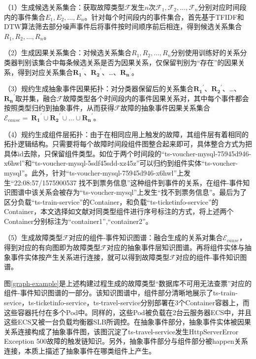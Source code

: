 （1）生成候选关系集合：获取故障类型$\mathcal{F}$发生$n$次$\mathcal{F}_1,\mathcal{F}_2,…,\mathcal{F}_n$分别对应时间段内的事件集合$E_1,E_2,…,E_n$。针对每个时间段内的事件集合，首先基于TFIDF\cite{joachims1996probabilistic}和DTW算法\cite{mueen2016extracting}筛去部分噪声事件后将事件按时间顺序前后相连，得到候选关系集合$R_1,R_2,…,R_n$。  

（2）生成因果关系集合：对候选关系集合$R_1,R_2,…,R_n$分别使用训练好的关系分类器判别该集合中每条候选关系是否为因果关系，仅保留判别为“存在”的因果关系，得到对应关系集合${\mathbf{R}_\mathbf{1}}^\prime$、${\mathbf{R}_\mathbf{2}}^\prime$、…、${\mathbf{R}_\mathbf{n}}^\prime$。

（3）规约生成抽象事件因果拓扑：对分类器保留后的关系集合${\mathbf{R}_\mathbf{1}}^\prime$、${\mathbf{R}_\mathbf{2}}^\prime$、…、${\mathbf{R}_\mathbf{n}}^\prime$取并集，融合$\mathcal{F}$故障类型各个时间段内的事件因果关系对，其中每个事件都会按照类型归约到抽象事件，从而获得$\mathcal{F}$故障的抽象事件因果关系集合$\mathcal{E}_{cause}=\ {\mathbf{R}_\mathbf{1}}^\prime\cup{\mathbf{R}_\mathbf{2}}^\prime\cup\ldots\cup{\mathbf{R}_\mathbf{n}}^\prime$。

（4）规约生成组件层拓扑：由于在相同应用上触发的故障，其组件层有着相同的拓扑逻辑结构。只需要将每个故障时间段组件图整合起来即可，具体整合方式为把具体id去除，只保留组件类型。如位于两个时间段的“ts-voucher-mysql-75945d946-x6hwl”和“ts-voucher-mysql-5sdf45sdd-xz45z”可以归约到组件实体“ts-voucher-mysql”。此外，针对“ts-voucher-mysql-75945d946-x6hwl”上发生“22:08:57/1575900537 找不到票务信息”这种组件到事件的关系，在组件-事件知识图谱中该关系会被存为“ts-voucher-mysql”上发生“找不到票务信息”。最后为了区分负载“ts-train-service”的Container，和负载“ts-ticketinfo-service”的Container，本文选择如文献\parencite{qiu2020causality-mining-knowledge-graph}对同类型组件进行序号标注的方式，将上述两个Container分别标注为“container1”,“container2”。

（5）生成故障类型$\mathcal{F}$对应的组件-事件知识图谱：融合生成的关系对集合$\mathcal{E}_{cause}$，得到对应的有向图即为故障类型$\mathcal{F}$对应的抽象事件层知识图谱。再将组件实体与抽象事件实体按产生关系进行连接，就可以得到故障类型$\mathcal{F}$对应的组件-事件知识图谱。

图\ref{graph-example}是上述构建过程生成的故障类型“数据库不可用无法查票”对应的组件-事件知识图谱的一部分。该知识图谱中，组件部分清晰地展示了ts-train-sevice，ts-ticketinfo-service，ts-travel-service分别部署在3个Container容器上，而这些容器托付在多个Pod中。同样的，这些Pod被负载在2台云服务器ECS中，并且这些ECS又被一台负载均衡器SLB所调控。在抽象事件部分，抽象事件实体被因果关系连接构成了抽象事件图，该图沉淀了ts-travel-service发生HttpServerError Exception 500故障的触发链知识。另外，抽象事件部分与组件部分被happen关系连接，本质上描述了抽象事件在哪类组件上产生。

